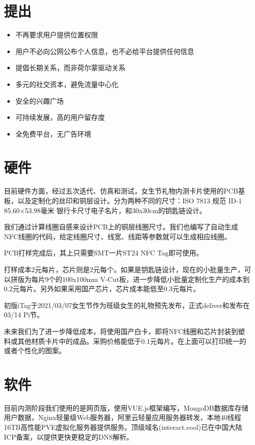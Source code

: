 \documentclass[UTF8]{ctexart}
\begin{document}
\section{提出}
\begin{itemize}
    \item 不再要求用户提供位置权限
    \item 用户不必向公网公布个人信息，也不必给平台提供任何信息
    \item 提倡长期关系，而非荷尔蒙驱动关系
    \item 多元的社交资本，避免流量中心化
    \item 安全的兴趣广场
    \item 可持续发展，高的用户留存度
    \item 全免费平台，无广告环境
\end{itemize}

\section{硬件}

目前硬件方面，经过五次迭代、仿真和测试，女生节礼物内测卡片使用的PCB基板，以及定制化的丝印和铜层设计。分为两种不同的尺寸：ISO 7813 规范 ID-1 85.60×53.98毫米 银行卡尺寸电子名片，和30x30cm的钥匙链设计。

我们通过计算线圈自感来设计PCB上的铜层线圈尺寸。我们也编写了自动生成NFC线圈的代码，给定线圈尺寸、线宽、线距等参数就可以生成相应线圈。

PCB打样完成后，其上只需要SMT一片ST24 NFC Tag即可使用。

打样成本2元每片，芯片则是2元每个。如果是钥匙链设计，现在的小批量生产，可以拼版为每片9个的100x100mm V-Cut板，进一步降低小批量定制化生产的成本到0.2元每片。另外如果采用国产芯片，芯片成本能低至0.3元每片。

初版iTag于2021/03/07女生节作为班级女生的礼物预先发布，正式deliver和发布在03/14 Pi节。

未来我们为了进一步降低成本，将使用国产白卡，即将NFC线圈和芯片封装到塑料或其他材质卡片中的成品。采购价格能低于0.1元每片。在上面可以打印统一的或者个性化的图案。

\section{软件}
目前内测阶段我们使用的是网页版，使用VUE.js框架编写，MongoDB数据库存储用户数据，Nginx轻量级Web服务器，阿里云轻量应用服务器转发，本地40线程16TB高性能PVE虚拟化服务器提供服务。顶级域名(interact.cool)已在中国大陆ICP备案，以提供更快更稳定的DNS解析。
\end{document}
